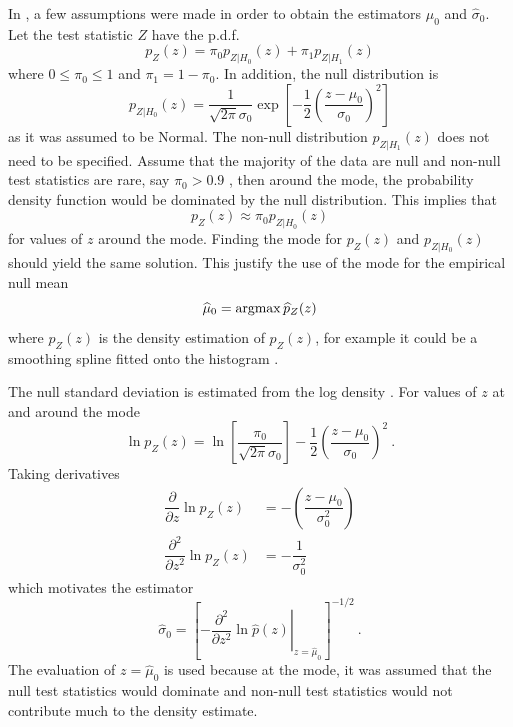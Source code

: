 In \cite{efron2004large}, a few assumptions were made in order to obtain the estimators $\widehat{\mu}_0$ and $\widehat{\sigma}_0$. Let the test statistic $Z$ have the p.d.f.
\begin{equation}
  p_Z(z) =
  \pi_0 p_{Z|H_0}(z) + \pi_1 p_{Z|H_1}(z)
\end{equation}
where $0\leqslant\pi_0\leqslant 1$ and  $\pi_1 = 1-\pi_0$. In addition, the null distribution is
\begin{equation}
  p_{Z|H_0}(z) = 
  \dfrac{1}{\sqrt{2\pi}\sigma_0}
  \exp\left[
    -\dfrac{1}{2}
    \left(
      \dfrac{z-{\mu}_0}{\sigma_0}
    \right)^2
  \right]
\end{equation}
as it was assumed to be Normal. The non-null distribution $p_{Z|H_1}(z)$ does not need to be specified. Assume that the majority of the data are null and non-null test statistics are rare, say $\pi_0>0.9$ \citep{efron2004large}, then around the mode, the probability density function would be dominated by the null distribution. This implies that
\begin{equation}
  p_{Z}(z) \approx \pi_0 p_{Z|H_0}(z)
\end{equation}
for values of $z$ around the mode. Finding the mode for $p_{Z}(z)$ and $p_{Z|H_0}(z)$ should yield the same solution. This justify the use of the mode for the empirical null mean \citep{efron2004large}
\begin{equation}
  \widehat{\mu}_0 = \operatorname*{argmax}\widehat{p}_Z(z)
\end{equation}
where $\widehat{p}_Z(z)$ is the density estimation of $p_Z(z)$, for example it could be a smoothing spline fitted onto the histogram \citep{efron2004large}.

The null standard deviation is estimated from the log density \citep{efron2004large}. For values of $z$ at and around the mode
\begin{equation}
  \ln p_{Z}(z) = 
  \ln\left[
    \dfrac{\pi_0}{\sqrt{2\pi}{\sigma}_0}
  \right]
  -\dfrac{1}{2}
  \left(
    \dfrac{z-{\mu}_0}{{\sigma}_0}
  \right)^2
  \ .
\end{equation}
Taking derivatives
\begin{align}
  \dfrac{\partial}{\partial z} \ln p_{Z}(z) &=
  -\left(
    \dfrac{
      z-{\mu}_0
    }
    {
      {\sigma}_0^2
    }
  \right)
  \\
  \dfrac{\partial^2}{\partial z^2} \ln p_{Z}(z) &=
  -\dfrac{
    1
  }
  {
    {\sigma}_0^2
  }
\end{align}
which motivates the estimator \citep{efron2004large}
\begin{equation}
  \widehat{\sigma}_0 = \left[
    \left.
      -\dfrac{\partial^2}{\partial z^2}\ln\widehat{p}(z)
    \right|_{z=\widehat{\mu}_0}
  \right]^{-1/2}
  \ .
  \label{eq:inference_nullStdEstimator}
\end{equation}
The evaluation of $z=\widehat{\mu}_0$ is used because at the mode, it was assumed that the null test statistics would dominate and non-null test statistics would not contribute much to the density estimate.

